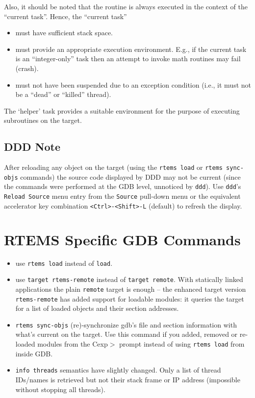 \documentclass{article}
\newcommand{\cmd}[1]{{\tt #1}}
\begin{document}
Also, it should be noted that the routine is always executed in the
context of the ``current task''. Hence, the ``current task''
\begin{itemize}
\item must have sufficient stack space.
\item must provide an appropriate execution environment. E.g., if the
      current task is an ``integer-only'' task then an attempt to invoke
      math routines may fail (crash).
\item must not have been suspended due to an exception condition (i.e.,
      it must not be a ``dead'' or ``killed'' thread).
\end{itemize}
The `helper' task provides a suitable environment for the purpose of
executing subroutines on the target.

\subsection{DDD Note}
After reloading any object on the target (using the \cmd{rtems load} or
\cmd{rtems sync-objs} commands) the source code displayed
by DDD may not be current (since the commands were performed
at the GDB level, unnoticed by \cmd{ddd}).
Use \cmd{ddd}'s \cmd{Reload Source} menu entry from the
\cmd{Source} pull-down menu or the equivalent accelerator key combination
\verb|<Ctrl>-<Shift>-L| (default) to refresh the display.

\section{RTEMS Specific GDB Commands}
\begin{itemize}
\item
use \cmd{rtems load} instead of \cmd{load}.

\item
use \cmd{target rtems-remote} instead of \cmd{target remote}.
With statically linked applications the plain \cmd{remote}
target is enough -- the enhanced target version \cmd{rtems-remote} has added
support for loadable modules: it queries the target for
a list of loaded objects and their section addresses.

\item
\cmd{rtems sync-objs} (re)-synchronize gdb's file and section information
	  with what's current on the target. Use this command if you
	  added, removed or re-loaded modules from the Cexp$>$ prompt
	  instead of using \cmd{rtems load} from inside GDB.

\item
\cmd{info threads} semantics have slightly changed. Only a list
	  of thread IDs/names is retrieved but not their stack frame
	  or IP address (impossible without stopping all threads).
\end{itemize}
\end{document}
